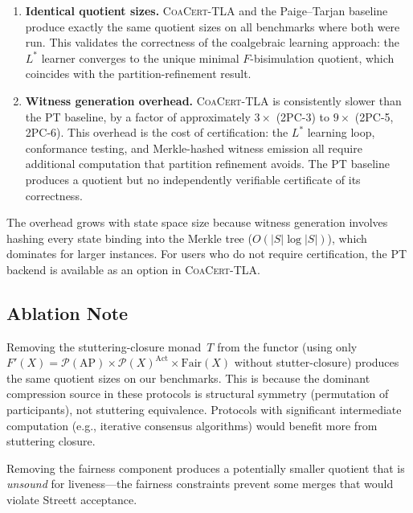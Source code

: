 \documentclass[11pt]{article}
\newcommand{\Pow}{\mathcal{P}}
\newcommand{\Fair}{\ensuremath{\mathrm{Fair}}}
\newcommand{\Act}{\ensuremath{\mathrm{Act}}}
\newcommand{\AP}{\ensuremath{\mathrm{AP}}}
\newcommand{\CoaCert}{\textsc{CoaCert-TLA}}
\begin{document}
\begin{enumerate}[nosep]
\item \textbf{Identical quotient sizes.}
  \CoaCert{} and the Paige--Tarjan baseline produce exactly the same
  quotient sizes on all benchmarks where both were run.
  This validates the correctness of the coalgebraic learning approach:
  the $L^*$ learner converges to the unique minimal $F$-bisimulation
  quotient, which coincides with the partition-refinement result.

\item \textbf{Witness generation overhead.}
  \CoaCert{} is consistently slower than the PT baseline, by a factor
  of approximately $3\times$ (2PC-3) to $9\times$ (2PC-5, 2PC-6).
  This overhead is the cost of certification: the $L^*$ learning loop,
  conformance testing, and Merkle-hashed witness emission all require
  additional computation that partition refinement avoids.
  The PT baseline produces a quotient but no independently verifiable
  certificate of its correctness.
\end{enumerate}

The overhead grows with state space size because witness generation
involves hashing every state binding into the Merkle tree ($O(|S| \log |S|)$),
which dominates for larger instances.
For users who do not require certification, the PT backend is available
as an option in \CoaCert{}.

\subsection{Ablation Note}

Removing the stuttering-closure monad~$T$ from the functor (using only
$F'(X) = \Pow(\AP) \times \Pow(X)^{\Act} \times \Fair(X)$ without
stutter-closure) produces the same quotient sizes on our benchmarks.
This is because the dominant compression source in these protocols is
structural symmetry (permutation of participants), not stuttering
equivalence.
Protocols with significant intermediate computation (e.g., iterative
consensus algorithms) would benefit more from stuttering closure.

Removing the fairness component produces a potentially smaller quotient
that is \emph{unsound} for liveness---the fairness constraints prevent
some merges that would violate Streett acceptance.

\end{document}
